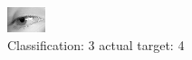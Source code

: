 \begin{figure}[h!]
\begin{center}
\includegraphics[width=0.60\columnwidth]{figures/ID3054_class_3_target_4.png}
\end{center}
\caption{ Classification: 3 actual target: 4}
\label{fig:ID3054_class_3_target_4}
\end{figure}
